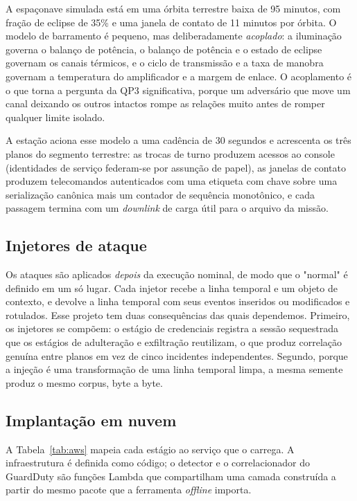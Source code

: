 \documentclass[conference]{IEEEtran}
\begin{document}
A espaçonave simulada está em uma órbita terrestre baixa de 95 minutos, com
fração de eclipse de 35\% e uma janela de contato de 11 minutos por órbita. O
modelo de barramento é pequeno, mas deliberadamente \emph{acoplado}: a
iluminação governa o balanço de potência, o balanço de potência e o estado de
eclipse governam os canais térmicos, e o ciclo de transmissão e a taxa de
manobra governam a temperatura do amplificador e a margem de enlace. O
acoplamento é o que torna a pergunta da QP3 significativa, porque um adversário
que move um canal deixando os outros intactos rompe as relações muito antes de
romper qualquer limite isolado.

A estação aciona esse modelo a uma cadência de 30 segundos e acrescenta os três
planos do segmento terrestre: as trocas de turno produzem acessos ao console
(identidades de serviço federam-se por assunção de papel), as janelas de contato
produzem telecomandos autenticados com uma etiqueta com chave sobre uma
serialização canônica mais um contador de sequência monotônico, e cada passagem
termina com um \emph{downlink} de carga útil para o arquivo da missão.

\subsection{Injetores de ataque}

Os ataques são aplicados \emph{depois} da execução nominal, de modo que o
"normal" é definido em um só lugar. Cada injetor recebe a linha temporal e um
objeto de contexto, e devolve a linha temporal com seus eventos inseridos ou
modificados e rotulados. Esse projeto tem duas consequências das quais
dependemos. Primeiro, os injetores se compõem: o estágio de credenciais
registra a sessão sequestrada que os estágios de adulteração e exfiltração
reutilizam, o que produz correlação genuína entre planos em vez de cinco
incidentes independentes. Segundo, porque a injeção é uma transformação de uma
linha temporal limpa, a mesma semente produz o mesmo corpus, byte a byte.

\subsection{Implantação em nuvem}

A Tabela~\ref{tab:aws} mapeia cada estágio ao serviço que o carrega. A
infraestrutura é definida como código; o detector e o correlacionador do
GuardDuty são funções Lambda que compartilham uma camada construída a partir do
mesmo pacote que a ferramenta \emph{offline} importa.
\end{document}
